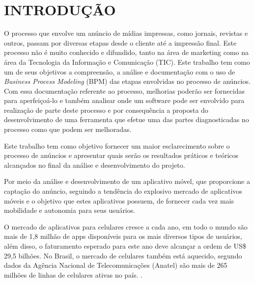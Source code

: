 \documentclass[
	12pt,				%
	openright,			%
	oneside,			%
	a4paper,			%
	chapter=TITLE,		%
	section=TITLE,		%
	english,			%
	french,				%
	spanish,			%
	brazil				%
	]{abntex2}
\begin{document}
\tableofcontents*
\clearpage

\textual



\chapter{INTRODUÇÃO}

O processo que envolve um anúncio de mídias impressas, como jornais, revistas e outros, passam por diversas etapas desde o cliente até a impressão final. Este processo não é muito conhecido e difundido, tanto na área de marketing como na área da Tecnologia da Informação e Comunicação (TIC). Este trabalho tem como um de seus objetivos a compreensão, a análise e documentação com o uso de \textit{Business Process Modeling} (BPM) das etapas envolvidas no processo de anúncios. Com essa documentação referente ao processo, melhorias poderão ser fornecidas para aperfeiçoá-lo e também analisar onde um software pode ser envolvido para realização de parte deste processo e por consequência a proposta do desenvolvimento de uma ferramenta que efetue uma das partes diagnosticadas no processo como que podem ser melhoradas. 

Este trabalho tem como objetivo fornecer um maior esclarecimento sobre o processo de anúncios e apresentar quais serão os resultados práticos e teóricos alcançados no final da análise e desenvolvimento do projeto.

Por meio da análise e desenvolvimento de um aplicativo móvel, que proporcione a captação do anúncio, seguindo a tendência do explosivo mercado de aplicativos móveis e o objetivo que estes aplicativos possuem, de fornecer cada vez mais mobilidade e autonomia para seus usuários. 

\begin{citacao}
O mercado de aplicativos para celulares cresce a cada ano, em todo o mundo são mais de 1,8 milhão de apps disponíveis para os mais diversos tipos de usuários, além disso, o faturamento esperado para este ano deve alcançar a ordem de US\$ 29,5 bilhões. No Brasil, o mercado de celulares também está aquecido, segundo dados da Agência Nacional de Telecomunicações (Anatel) são mais de 265 milhões de linhas de celulares ativas no país. \cite{sebrae2014}.
\end{citacao}
\end{document}
